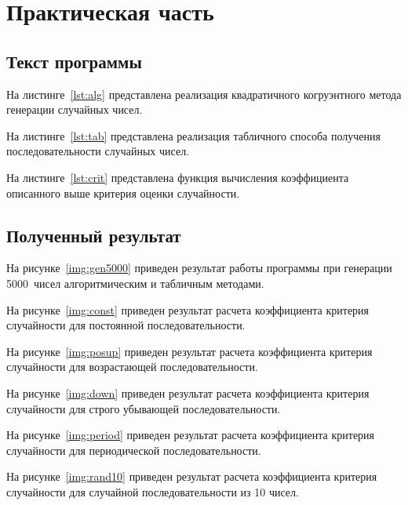 \chapter{Практическая часть}

\section{Текст программы}

{
\captionsetup{format=hang,justification=raggedright,
              singlelinecheck=off,width=16cm}
На листинге~\ref{lst:alg} представлена реализация квадратичного
когруэнтного метода генерации случайных чисел.


\clearpage
На листинге~\ref{lst:tab} представлена реализация табличного способа
получения последовательности случайных чисел.


\clearpage
На листинге~\ref{lst:crit} представлена функция вычисления коэффициента
описанного выше критерия оценки случайности.

}

\section{Полученный результат}

На рисунке~\ref{img:gen5000} приведен результат работы программы при генерации
5000~чисел алгоритмическим и табличным методами.


На рисунке~\ref{img:const} приведен результат расчета коэффициента критерия
случайности для постоянной последовательности.


На рисунке~\ref{img:posup} приведен результат расчета коэффициента критерия
случайности для возрастающей последовательности.


На рисунке~\ref{img:down} приведен результат расчета коэффициента критерия
случайности для строго убывающей последовательности.


На рисунке~\ref{img:period} приведен результат расчета коэффициента критерия
случайности для периодической последовательности.


На рисунке~\ref{img:rand10} приведен результат расчета коэффициента критерия
случайности для случайной последовательности из 10 чисел.

